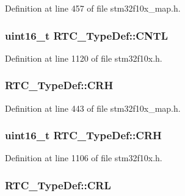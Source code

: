 Definition at line 457 of file stm32f10x\+\_\+map.\+h.

\subsubsection[{\texorpdfstring{C\+N\+TL}{CNTL}}]{ {\bf uint16\+\_\+t} R\+T\+C\+\_\+\+Type\+Def\+::\+C\+N\+TL}\hypertarget{struct_r_t_c___type_def_a212cb62d18ce312bc3f69641aa76688d}{}\label{struct_r_t_c___type_def_a212cb62d18ce312bc3f69641aa76688d}


Definition at line 1120 of file stm32f10x.\+h.

\subsubsection[{\texorpdfstring{C\+RH}{CRH}}]{ R\+T\+C\+\_\+\+Type\+Def\+::\+C\+RH}\hypertarget{struct_r_t_c___type_def_a8eb1b48381b16f72b508cc7d55338737}{}\label{struct_r_t_c___type_def_a8eb1b48381b16f72b508cc7d55338737}


Definition at line 443 of file stm32f10x\+\_\+map.\+h.

\subsubsection[{\texorpdfstring{C\+RH}{CRH}}]{ {\bf uint16\+\_\+t} R\+T\+C\+\_\+\+Type\+Def\+::\+C\+RH}\hypertarget{struct_r_t_c___type_def_aad5162f4b5b15deb174479e8e543db82}{}\label{struct_r_t_c___type_def_aad5162f4b5b15deb174479e8e543db82}


Definition at line 1106 of file stm32f10x.\+h.

\subsubsection[{\texorpdfstring{C\+RL}{CRL}}]{ R\+T\+C\+\_\+\+Type\+Def\+::\+C\+RL}\hypertarget{struct_r_t_c___type_def_a777228792aa47e88c33492c356646865}{}\label{struct_r_t_c___type_def_a777228792aa47e88c33492c356646865}


